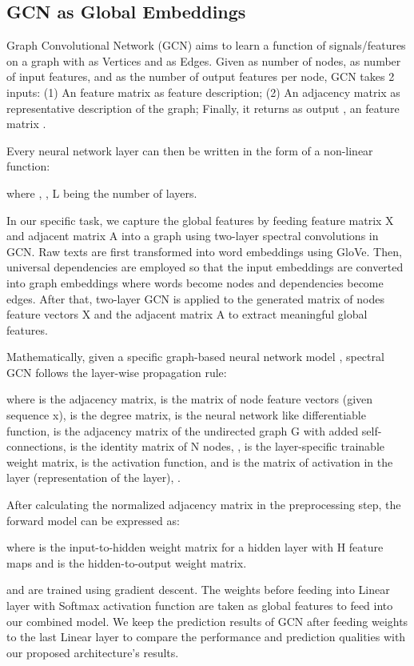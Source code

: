 \documentclass[runningheads]{llncs}
\begin{document}
\subsection{GCN as Global Embeddings}

Graph Convolutional Network (GCN) aims to learn a function of signals/features on a graph  with  as Vertices and  as Edges. Given  as number of nodes,  as number of input features, and  as the number of output features per node, GCN takes 2 inputs:
(1) An  feature matrix  as feature description; (2) An adjacency matrix  as representative description of the graph; Finally, it returns as output , an  feature matrix \cite{duvenaud2015convolutional}.

Every neural network layer can then be written in the form of a non-linear function:

where , ,  L being the number of layers. 

In our specific task, we capture the global features by feeding feature matrix X and adjacent matrix A into a graph using two-layer spectral convolutions in GCN. Raw texts are first transformed into word embeddings using GloVe. Then, universal dependencies are employed so that the input embeddings are converted into graph embeddings where words become nodes and dependencies become edges. After that, two-layer GCN is applied to the generated matrix of nodes feature vectors X and the adjacent matrix A to extract meaningful global features.

Mathematically, given a specific graph-based neural network model , spectral GCN follows the layer-wise propagation rule:

where  is the adjacency matrix,  is the matrix of node feature vectors (given sequence x),  is the degree matrix,  is the neural network like differentiable function,  is the adjacency matrix of the undirected graph G with added self-connections,   is the identity matrix of N nodes, ,  is the layer-specific trainable weight matrix,  is the activation function, and  is the matrix of activation in the  layer (representation of the  layer), .

After calculating the normalized adjacency matrix  in the preprocessing step, the forward model can be expressed as:

where  is the input-to-hidden weight matrix for a hidden layer with H feature maps and  is the hidden-to-output weight matrix.


 and  are trained using gradient descent. The weights before feeding into Linear layer with Softmax activation function are taken as global features to feed into our combined model. We keep the prediction results of GCN after feeding weights to the last Linear layer to compare the performance and prediction qualities with our proposed architecture's results.
\end{document}
